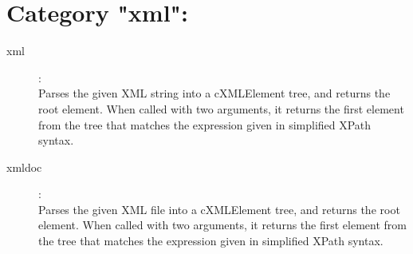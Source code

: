 \section{Category "xml":}
\label{sec:ned-functions:category-xml}

\begin{description}
\item[xml]:  \\
    Parses the given XML string into a cXMLElement tree, and returns the root element. When called with two arguments, it returns the first element from the tree that matches the expression given in simplified XPath syntax.
\item[xmldoc]:  \\
    Parses the given XML file into a cXMLElement tree, and returns the root element. When called with two arguments, it returns the first element from the tree that matches the expression given in simplified XPath syntax.
\end{description}

